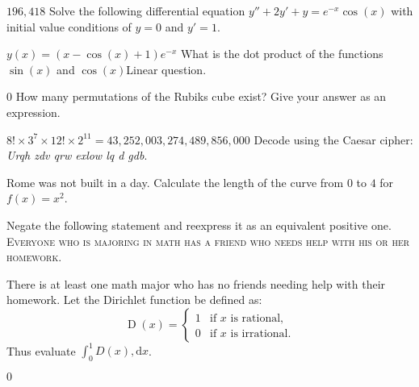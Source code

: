 \documentclass[12pt,twoside,addpoints]{exam}
\makeatletter
\DeclareMathOperator{\Dirichlet}{D}
\renewenvironment{solutionordottedlines}[1][]
  {%
   \def\@tempa{#1}%
   \expandafter\comment
  }
  {%
   \expandafter\endcomment
  }
\makeatother
\begin{document}
\begin{questions}
        \begin{solutionordottedlines}[1in]
            $196,418$
        \end{solutionordottedlines}
    \question[2] Solve the following differential equation $y'' + 2y' + y = e^{-x}\cos(x)$ with initial value conditions of $y = 0$ and $y' = 1$.
        \begin{solutionordottedlines}[1in]
            $y(x) = (x-\cos(x)+1)e^{-x}$
        \end{solutionordottedlines}
    \question[2] What is the dot product of the functions $\sin(x)$ and $\cos(x)$Linear question.
        \begin{solutionordottedlines}[1in]
            $0$
        \end{solutionordottedlines}
    \question[3] How many permutations of the Rubiks cube exist? Give your answer as an expression.
        \begin{solutionordottedlines}[1in]
            $8! \times 3^7 \times 12! \times 2^{11} = 43,252,003,274,489,856,000$
        \end{solutionordottedlines}
    \question[2] Decode using the Caesar cipher: \textit{Urqh zdv qrw exlow lq d gdb}.
        \begin{solutionordottedlines}[1in]
            Rome was not built in a day.
        \end{solutionordottedlines}
    \question[2] Calculate the length of the curve from $0$ to $4$ for $f(x) = x^2$.
        \begin{solutionordottedlines}[1in]
        \end{solutionordottedlines}
    \question[2] Negate the following statement and reexpress it as an equivalent positive one.
    \textsc{Everyone who is majoring in math has a friend who needs help with his or her homework.}
        \begin{solutionordottedlines}[1in]
            There is at least one math major who has no friends needing help with their homework.
        \end{solutionordottedlines}
    \question[2] Let the Dirichlet function be defined as:
        \[
        \Dirichlet(x) =
        \begin{cases} 
        1 & \text{if } x \text{ is rational}, \\
        0 & \text{if } x \text{ is irrational}.
        \end{cases}
        \]
        Thus evaluate \(\int_0^1 D(x), \mathrm{d}x\).

        \begin{solutionordottedlines}[1in]
            $0$
        \end{solutionordottedlines}
\end{questions}
\end{document}
